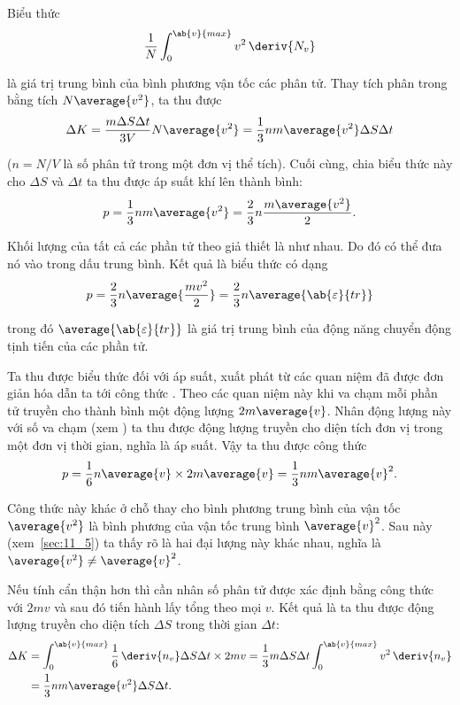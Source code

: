 Biểu thức
\begin{equation*}
	\frac{1}{N}\int_{0}^{\ab{v}{max}} v^2\,\deriv{N_v}
\end{equation*}

\noindent
là giá trị trung bình của bình phương vận tốc các phân tử. Thay tích phân trong  bằng tích $N\average{v^2}$, ta thu được 
\begin{equation*}
	\Delta K = \frac{m\Delta S\Delta t}{3V} N \average{v^2} = \frac{1}{3} nm \average{v^2} \Delta S\Delta t
\end{equation*}

\noindent
($n=N/V$ là số phân tử trong một đơn vị thể tích). Cuối cùng, chia biểu thức này cho $\Delta S$ và $\Delta t$ ta thu được áp suất khí lên thành bình:
\begin{equation}\label{eq:11_27}
	p = \frac{1}{3} nm \average{v^2} = \frac{2}{3} n \frac{m\average{v^2}}{2}.
\end{equation}

Khối lượng của tất cả các phần tử theo giả thiết là như nhau. Do đó có thể đưa nó vào trong dấu trung bình. Kết quả là biểu thức  có dạng
\begin{equation}\label{eq:11_28}
	p = \frac{2}{3} n \average{\frac{mv^2}{2}} = \frac{2}{3}n\average{\ab{\varepsilon}{tr}}
\end{equation}

\noindent
trong đó $\average{\ab{\varepsilon}{tr}}$ là giá trị trung bình của động năng chuyển động tịnh tiến của các phần tử.

Ta thu được biểu thức đối với áp suất, xuất phát từ các quan niệm đã được đơn giản hóa dẫn ta tới công thức . Theo các quan niệm này khi va chạm mỗi phần tử truyền cho thành bình một động lượng $2m\average{v}$. Nhân động lượng này với số va chạm (xem ) ta thu được động lượng truyền cho diện tích đơn vị trong một đơn vị thời gian, nghĩa là áp suất. Vậy ta thu được công thức 
\begin{equation}\label{eq:11_29}
	p = \frac{1}{6} n \average{v} \times 2m\average{v} = \frac{1}{3}nm\average{v}^2.
\end{equation}

\noindent
Công thức này khác  ở chỗ thay cho bình phương trung bình của vận tốc $\average{v^2}$ là bình phương của vận tốc trung bình $\average{v}^2$. Sau này (xem~\ref{sec:11_5}) ta thấy rõ là hai đại lượng này khác nhau, nghĩa là $\average{v^2}\neq\average{v}^2$.

Nếu tính cẩn thận hơn thì cần nhân số phân tử được xác định bằng công thức  với $2mv$ và sau đó tiến hành lấy tổng theo mọi $v$. Kết quả là ta thu được động lượng truyền cho diện tích $\Delta S$ trong thời gian $\Delta t$:
\begin{align*}
	\Delta K &= \int_{0}^{\ab{v}{max}} \frac{1}{6}\,\deriv{n_v}\Delta S\Delta t \times 2mv = \frac{1}{3}m \Delta S\Delta t \int_{0}^{\ab{v}{max}} v^2\,\deriv{n_v}\\
	&= \frac{1}{3}nm\average{v^2} \Delta S\Delta t.
\end{align*}

